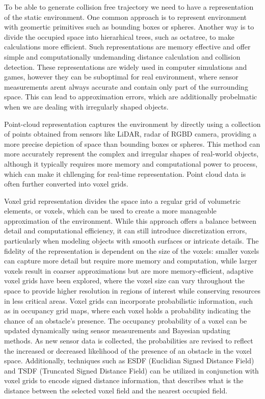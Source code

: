 \documentclass[letterpaper, 10 pt, conference]{ieeeconf}  %
\begin{document}

To be able to generate collision free trajectory we need to have a representation of the static environment. One common approach is to represent environment with geomertic primitives such as bounding boxes or spheres. Another way is to divide the occupied space into hierarhical trees, such as octatree, to make calculations more efficient. Such representations are memory effective and offer simple and computationally undemanding distance calculation and collision detection. These representations are widely used in computer simulations and games, however they can be suboptimal for real environment, where sensor measurements arent always accurate and contain only part of the surrounding space. This can lead to approximation errors, which are additionally probelmatic when we are dealing with irregularly shaped objects.

Point-cloud representation captures the environment by directly using a collection of points obtained from sensors like LiDAR, radar of RGBD camera, providing a more precise depiction of space than bounding boxes or spheres. This method can more accurately represent the complex and irregular shapes of real-world objects, although it typically requires more memory and computational power to process, which can make it chllenging for real-time representation. Point cloud data is often further converted into voxel grids.

Voxel grid representation divides the space into a regular grid of volumetric elements, or voxels, which can be used to create a more manageable approximation of the environment. While this approach offers a balance between detail and computational efficiency, it can still introduce discretization errors, particularly when modeling objects with smooth surfaces or intricate details. The fidelity of the representation is dependent on the size of the voxels: smaller voxels can capture more detail but require more memory and computation, while larger voxels result in coarser approximations but are more memory-efficient, adaptive voxel grids have been explored, where the voxel size can vary throughout the space to provide higher resolution in regions of interest while conserving resources in less critical areas. Voxel grids can incorporate probabilistic information, such as in occupancy grid maps, where each voxel holds a probability indicating the chance of an obstacle's presence. The occupancy probability of a voxel can be updated dynamically using sensor measurements and Bayesian updating methods. As new sensor data is collected, the probabilities are revised to reflect the increased or decreased likelihood of the presence of an obstacle in the voxel space. Additionally, techniques such as ESDF (Euclidian Signed Distance Field) and TSDF (Truncated Signed Distance Field) can be utilized in conjunction with voxel grids to encode signed distance information, that describes what is the distance between the selected voxel field and the nearest occupied field.
\end{document}
